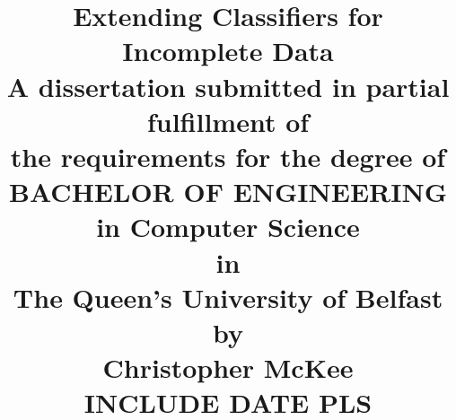 \documentclass[12pt,a4paper]{report}
\begin{document}
\title{Extending Classifiers for Incomplete Data\\
\large
A dissertation submitted in partial fulfillment of\\
the requirements for the degree of\\
BACHELOR OF ENGINEERING in Computer Science\\
in\\
The Queen's University of Belfast\\
by\\
Christopher McKee\\
INCLUDE DATE PLS}
\maketitle
\newpage


\tableofcontents





\end{document}
